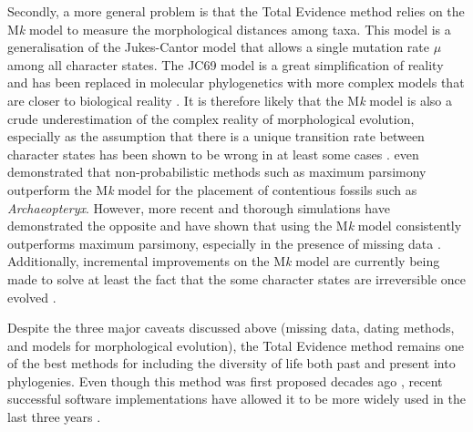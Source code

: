 Secondly, a more general problem is that the Total Evidence method relies on the M\textit{k} model \citep{lewisa2001} to measure the morphological distances among taxa. %
This model is a generalisation of the Jukes-Cantor model \citep[JC69;][]{jukes1969evolution} that allows a single mutation rate $\mu$ among all character states.
The JC69 model is a great simplification of reality and has been replaced in molecular phylogenetics with more complex models that are closer to biological reality \citep[e.g. the GTR model that allows a different rate for each different type of nucleotide change;][]{tavare1986}.
It is therefore likely that the M\textit{k} model is also a crude underestimation of the complex reality of morphological evolution, especially as the assumption that there is a unique transition rate between character states has been shown to be wrong in at least some cases \citep[e.g. for Dollo traits that are irreversible;][]{WrightDollo}.
\cite{spencerefficacy2013} even demonstrated that non-probabilistic methods such as maximum parsimony outperform the M\textit{k} model for the placement of contentious fossils such as \textit{Archaeopteryx}.
However, more recent and thorough simulations have demonstrated the opposite and have shown that using the M\textit{k} model consistently outperforms maximum parsimony, especially in the presence of missing data \citep{wrightbayesian2014}.
Additionally, incremental improvements on the M\textit{k} model are currently being made to solve at least the fact that the some character states are irreversible once evolved \citep[][and personal communications]{Klopfstein12082015}.

Despite the three major caveats discussed above (missing data, dating methods, and models for morphological evolution), the Total Evidence method remains one of the best methods for including the diversity of life both past and present into phylogenies.
Even though this method was first proposed decades ago \citep[e.g.][]{eernissetaxonomic1993}, recent successful software implementations \citep{Ronquist2012mrbayes,BEAST2} have allowed it to be more widely used in the last three years \citep{ronquista2012,Slater2012MEE,Wood01032013,schragocombining2013,beckancient2014,Arcila2015131,Dembo2015,Klopfstein12082015,Carrizo,Wittenberg2015TEM,gavryushkina2015bayesian}.

